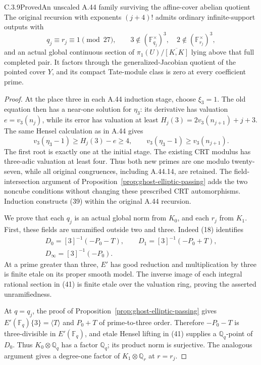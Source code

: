 \begin{result}{C.3.9}{Proved}{An unscaled A.44 family surviving the affine-cover abelian quotient}
\label{prop:ghost-original-genjac-survival}
The original recursion with exponents \((j+4)!\)
admits ordinary infinite-support outputs with
\[
 q_j\equiv r_j\equiv1\pmod {27},\qquad
 3\notin(\mathbb F_{q_j}^\times)^3,
       \quad2\notin(\mathbb F_{r_j}^\times)^3,        \tag{39}
\]
and an actual global continuous section of
\(\pi_1(U)/\overline{[K,K]}\) lying above that
full completed pair. It factors through the
generalized-Jacobian quotient of the pointed
cover \(Y\), and its compact Tate-module class
is zero at every coefficient prime.
\end{result}
\begin{proof}
At the place three in each A.44 induction stage,
choose \(\xi_3=1\). The old equation then has
a near-one solution for \(\eta_3\): its derivative
has valuation \(e=v_3(n_j)\), while its error has
valuation at least
\(H_j(3)=2v_3(n_{j+1})+j+3\).
The same Hensel calculation as in A.44 gives
\[
 v_3(\eta_3-1)\ge H_j(3)-e\ge4,
       \qquad v_3(\eta_3-1)\ge v_3(n_{j+1}).         \tag{40}
\]
The first root is exactly one at the initial
stage. The existing CRT modulus has three-adic
valuation at least four. Thus both new primes
are one modulo twenty-seven, while all original
congruences, including A.44.14, are retained.
The field-intersection argument of
Proposition~\ref{prop:ghost-elliptic-passing}
adds the two noncube conditions without changing
these prescribed CRT automorphisms. Induction
constructs (39) within the original A.44 recursion.

We prove that each \(q_j\) is an actual global
norm from \(K_0\), and each \(r_j\) from \(K_1\).
First, these fields are unramified outside two
and three. Indeed (18) identifies
\[
 \begin{gathered}
 D_0=[3]^{-1}(-P_0-T),\qquad
 D_1=[3]^{-1}(-P_0+T),\\
 D_\infty=[3]^{-1}(-P_0).
 \end{gathered}                                      \tag{41}
\]
At a prime greater than three, \(E'\) has good
reduction and multiplication by three is finite
etale on its proper smooth model. The inverse
image of each integral rational section in (41)
is finite etale over the valuation ring, proving
the asserted unramifiedness.

At \(q=q_j\), the proof of
Proposition~\ref{prop:ghost-elliptic-passing} gives
\(E'(\mathbb F_q)\{3\}=\langle T\rangle\) and
\(P_0+T\) of prime-to-three order. Therefore
\(-P_0-T\) is three-divisible in
\(E'(\mathbb F_q)\), and etale Hensel lifting in
(41) supplies a \(\mathbb Q_q\)-point of \(D_0\).
Thus \(K_0\otimes\mathbb Q_q\) has a factor
\(\mathbb Q_q\); its product norm is surjective.
The analogous argument gives a degree-one factor
of \(K_1\otimes\mathbb Q_r\) at \(r=r_j\).


\end{proof}
